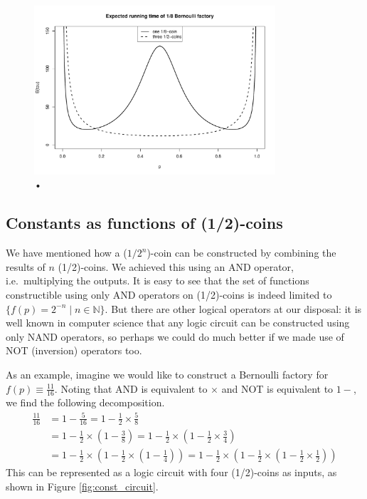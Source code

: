 \documentclass{article}
\theoremstyle{definition}
\newcommand{\AND}{{\footnotesize AND }}
\newcommand{\NOT}{{\footnotesize NOT }}
\begin{document}
\begin{figure}
\centering
\includegraphics[width=0.8\textwidth]{const8_runtime.pdf}
\caption{•}
\label{fig:runtime_const8}
\end{figure}

\subsection{Constants as functions of (1/2)-coins}
We have mentioned how a ($1/2^{n}$)-coin can be constructed by combining the results of $n$ (1/2)-coins. We achieved this using an \AND operator, i.e.\ multiplying the outputs. It is easy to see that the set of functions constructible using only \AND operators on (1/2)-coins is indeed limited to $\{f(p)=2^{-n} \mid n\in\mathbb{N}\}$. But there are other logical operators at our disposal: it is well known in computer science that any logic circuit can be constructed using only {\footnotesize NAND} operators, so perhaps we could do much better if we made use of \NOT (inversion) operators too.

As an example, imagine we would like to construct a Bernoulli factory for $f(p)\equiv \frac{11}{16}$. Noting that \AND is equivalent to $\times$ and \NOT is equivalent to $1-$, we find the following decomposition.
\begin{align*}
\frac{11}{16} &= 1- \frac{5}{16} 
= 1 - \frac{1}{2} \times \frac{5}{8} \\
&= 1 - \frac{1}{2} \times \left(1 - \frac{3}{8}\right) 
= 1 - \frac{1}{2} \times \left(1 - \frac{1}{2} \times \frac{3}{4}\right) \\
&= 1 - \frac{1}{2} \times \left(1 - \frac{1}{2} \times \left(1-\frac{1}{4}\right)\right)
= 1 - \frac{1}{2} \times \left(1 - \frac{1}{2} \times \left(1-\frac{1}{2} \times \frac{1}{2}\right)\right)
\end{align*}
This can be represented as a logic circuit with four (1/2)-coins as inputs, as shown in Figure \ref{fig:const_circuit}.
\end{document}
